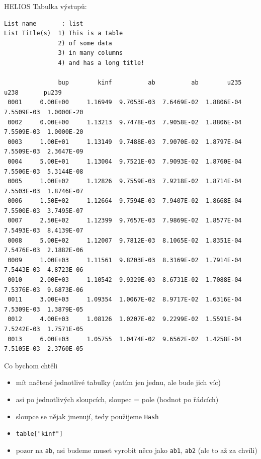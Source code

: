 \documentclass{beamer}
\begin{document}
\begin{frame}[fragile]{HELIOS}
  Tabulka výstupů:
  \scriptsize
  \begin{verbatim}
List name       : list
List Title(s)  1) This is a table
               2) of some data
               3) in many columns
               4) and has a long title!

               bup        kinf          ab          ab        u235        u238       pu239
 0001     0.00E+00     1.16949  9.7053E-03  7.6469E-02  1.8806E-04  7.5509E-03  1.0000E-20
 0002     0.00E+00     1.13213  9.7478E-03  7.9058E-02  1.8806E-04  7.5509E-03  1.0000E-20
 0003     1.00E+01     1.13149  9.7488E-03  7.9070E-02  1.8797E-04  7.5509E-03  2.3647E-09
 0004     5.00E+01     1.13004  9.7521E-03  7.9093E-02  1.8760E-04  7.5506E-03  5.3144E-08
 0005     1.00E+02     1.12826  9.7559E-03  7.9218E-02  1.8714E-04  7.5503E-03  1.8746E-07
 0006     1.50E+02     1.12664  9.7594E-03  7.9407E-02  1.8668E-04  7.5500E-03  3.7495E-07
 0007     2.50E+02     1.12399  9.7657E-03  7.9869E-02  1.8577E-04  7.5493E-03  8.4139E-07
 0008     5.00E+02     1.12007  9.7812E-03  8.1065E-02  1.8351E-04  7.5476E-03  2.1882E-06
 0009     1.00E+03     1.11561  9.8203E-03  8.3169E-02  1.7914E-04  7.5443E-03  4.8723E-06
 0010     2.00E+03     1.10542  9.9329E-03  8.6731E-02  1.7088E-04  7.5376E-03  9.6873E-06
 0011     3.00E+03     1.09354  1.0067E-02  8.9717E-02  1.6316E-04  7.5309E-03  1.3879E-05
 0012     4.00E+03     1.08126  1.0207E-02  9.2299E-02  1.5591E-04  7.5242E-03  1.7571E-05
 0013     6.00E+03     1.05755  1.0474E-02  9.6562E-02  1.4258E-04  7.5105E-03  2.3760E-05
  \end{verbatim}
\end{frame}

\begin{frame}{Co bychom chtěli}
  \begin{itemize}
    \item mít načtené jednotlivé tabulky (zatím jen jednu, ale bude jich víc)
    \item asi po jednotlivých sloupcích, sloupec = pole (hodnot po řádcích)
    \item sloupce se nějak jmenují, tedy použijeme \texttt{Hash}
    \item \texttt{table["kinf"]}
    \item pozor na \texttt{ab}, asi budeme muset vyrobit něco jako \texttt{ab1}, \texttt{ab2} (ale to až za chvíli)
  \end{itemize}
\end{frame}
\end{document}
